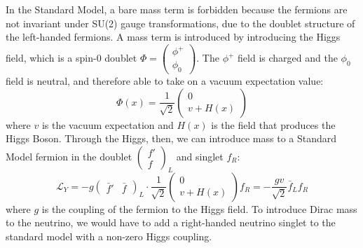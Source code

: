 \documentclass[/main.tex]{subfiles}
\begin{document}
In the Standard Model, a bare mass term is forbidden because the fermions are not invariant under SU(2) gauge transformations, due to the doublet structure of the left-handed fermions.
A mass term is introduced by introducing the Higgs field, which is a spin-0 doublet $\Phi=\begin{pmatrix} \phi^+ \\ \phi_0\end{pmatrix}$.
The $\phi^+$ field is charged and the $\phi_0$ field is neutral, and therefore able to take on a vacuum expectation value:
\begin{equation}
  \Phi(x)=\frac{1}{\sqrt{2}}\begin{pmatrix}  0\\ v+H(x)\end{pmatrix}
\end{equation}
where $v$ is the vacuum expectation and $H(x)$ is the field that produces the Higgs Boson.
Through the Higgs, then, we can introduce mass to a Standard Model fermion in the doublet $\begin{pmatrix}f' \\ f\end{pmatrix}_L$ and singlet $f_R$:
\begin{equation}
  \mathcal{L}_{Y}=-g\begin{pmatrix}\bar f' & \bar f\end{pmatrix}_L \cdot\frac{1}{\sqrt{2}}\begin{pmatrix}0 \\ v+H(x)\end{pmatrix} f_R = -\frac{gv}{\sqrt{2}}\bar f_Lf_R
\end{equation}
where $g$ is the coupling of the fermion to the Higgs field.
To introduce Dirac mass to the neutrino, we would have to add a right-handed neutrino singlet to the standard model with a non-zero Higgs coupling.
\end{document}

